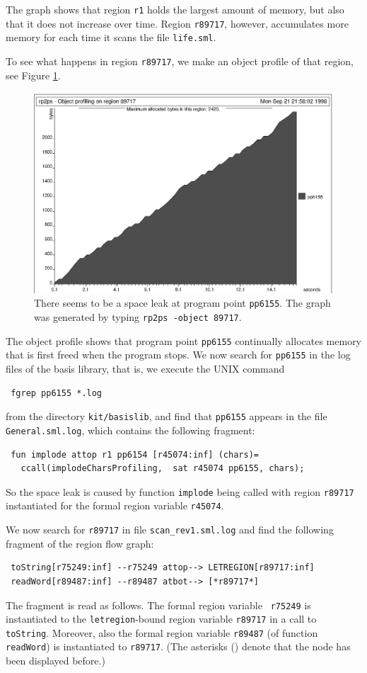 \documentclass[12pt]{book}
\begin{document}
The graph shows that region \texttt{r1} holds the largest amount of memory,
but also that it does not increase over time. Region \texttt{r89717}, however,
accumulates more memory for each time it scans the file {\tt life.sml}.

To see what happens in region \texttt{r89717}, we make an object profile of
that region, see Figure \ref{scan_rev1_2.fig}.
\begin{figure}
\begin{center}
  \includegraphics{scan_rev1_2.ps}
\end{center}
\caption{There seems to be a space leak at program point
  \texttt{pp6155}. The graph was generated by typing \texttt{rp2ps
    -object 89717}.}
\label{scan_rev1_2.fig}
\end{figure}
The object profile shows that program point \texttt{pp6155}
continually allocates memory that is first freed when the program
stops. We now search for \texttt{pp6155} in the log files of the basis
library, that is, we execute the UNIX command
\begin{verbatim}
 fgrep pp6155 *.log
\end{verbatim}
from the directory {\tt kit/basislib}, and find that {\tt pp6155}
appears in the file {\tt General.sml.log}, which contains the following
fragment:
\begin{verbatim}
 fun implode attop r1 pp6154 [r45074:inf] (chars)= 
   ccall(implodeCharsProfiling,  sat r45074 pp6155, chars);
\end{verbatim}
So the space leak is caused by function {\tt implode} being called
with region {\tt r89717} instantiated for the formal region variable
{\tt r45074}.

We now search for \texttt{r89717} in file \texttt{scan\_rev1.sml.log} and
find the following fragment of the region flow graph:
\begin{verbatim}
 toString[r75249:inf] --r75249 attop--> LETREGION[r89717:inf]
 readWord[r89487:inf] --r89487 atbot--> [*r89717*]
\end{verbatim}
The fragment is read as follows. The formal region variable {\tt
  r75249} is instantiated to the {\tt letregion}-bound region variable
{\tt r89717} in a call to {\tt toString}. Moreover, also the formal
region variable {\tt r89487} (of function {\tt readWord}) is
instantiated to {\tt r89717}. (The asterisks ({\tt *}) denote that the
node has been displayed before.)
\end{document}
